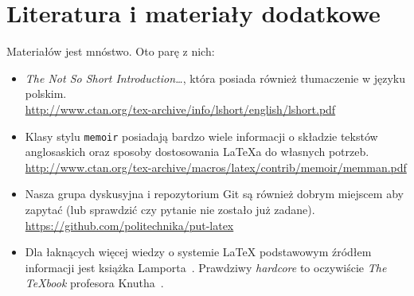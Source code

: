 

\section{Literatura i materiały dodatkowe}

Materiałów jest mnóstwo. Oto parę z nich:
\begin{itemize}
    \item \emph{The Not So Short Introduction\ldots}, która posiada również tłumaczenie 
    w języku polskim.\\
    \url{http://www.ctan.org/tex-archive/info/lshort/english/lshort.pdf}

    \item Klasy stylu \texttt{memoir} posiadają bardzo wiele informacji o składzie tekstów
    anglosaskich oraz sposoby dostosowania \LaTeX{}a do własnych potrzeb.\\
    \url{http://www.ctan.org/tex-archive/macros/latex/contrib/memoir/memman.pdf}
    
    \item Nasza grupa dyskusyjna i repozytorium Git są również dobrym miejscem aby zapytać
    (lub sprawdzić czy pytanie nie zostało już zadane).\\
    \url{https://github.com/politechnika/put-latex}

    \item Dla łaknących więcej wiedzy o systemie LaTeX podstawowym źródłem informacji
    jest książka Lamporta~\cite{Lamport1985}. Prawdziwy \emph{hardcore} to oczywiście
    \emph{The \TeX{}book} profesora Knutha~\cite{Knuth1986}.
\end{itemize}

